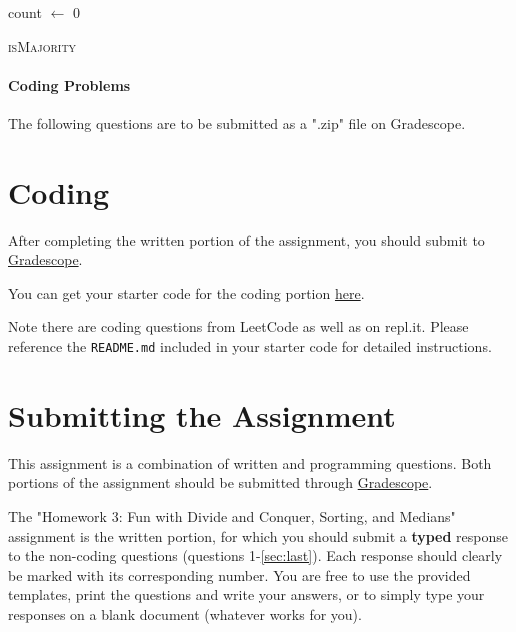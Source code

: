 \documentclass [12pt]{article}
\begin{document}
\begin{algorithm}[H]
    count $\gets $ 0\;
     {
    }
     
    \caption {\textsc {isMajority}} 
    \label{alg:isMajority}
\end{algorithm} 



\pagebreak
\begin{Instruction}

\paragraph{Coding Problems} The following questions are to be submitted as a ".zip" file on Gradescope. 

\end{Instruction}

\section{Coding }
 After completing the written portion of the assignment, you should submit to \href{https://www.gradescope.com/courses/350304}{Gradescope}.

You can get your starter code for the coding portion \href{https://replit.com/team/COMP285/HW2-Code}{here}.

Note there are coding questions from LeetCode as well as on repl.it. Please reference the \texttt{README.md} included in your starter code for detailed instructions.

\section*{Submitting the Assignment}

This assignment is a combination of written and programming questions. Both portions of the assignment should be submitted through \href{https://www.gradescope.com/courses/350304}{Gradescope}.

The "Homework 3: Fun with Divide and Conquer, Sorting, and Medians" assignment is the written portion, for which you should submit a \textbf{typed} response to the non-coding questions (questions 1-\ref{sec:last}). Each response should clearly be marked with its corresponding number. You are free to use the provided templates, print the questions and write your answers, or to simply type your responses on a blank document (whatever works for you).
\end{document}
